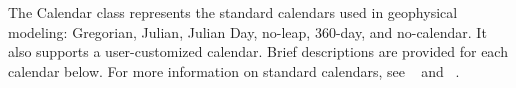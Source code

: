 
\label{sec:Calendar}
The Calendar class represents the standard calendars used in 
geophysical modeling:  Gregorian, Julian, Julian Day, no-leap, 360-day, and 
no-calendar.  It also supports a user-customized calendar.  Brief 
descriptions are provided for each calendar below.  For more information 
on standard calendars, see ~\cite{Seidelman} and ~\cite{Meyer1}.
